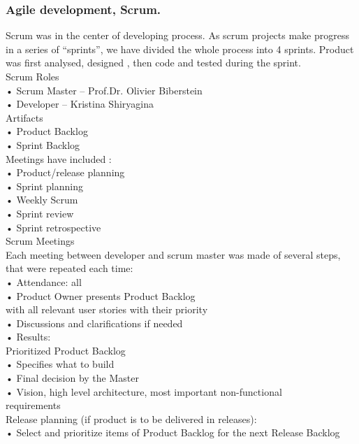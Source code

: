 \documentclass{scrartcl}
\begin{document}
\subsubsection{ Agile development, Scrum.} 
Scrum was in the center of developing process.
As scrum projects make progress in a series of “sprints”, we have divided the whole process into
4 sprints. Product was first analysed, designed , then code and tested during the sprint. \\
Scrum
Roles \\
	•	Scrum Master – Prof.Dr. Olivier Biberstein\\
	•	Developer – Kristina Shiryagina\\
 Artifacts \\
	•	Product Backlog\\
	•	Sprint Backlog\\
 Meetings have included :\\
	•	Product/release planning\\
	•	Sprint planning\\
	•	Weekly Scrum\\
	•	Sprint review\\
	•	Sprint retrospective\\
Scrum Meetings \\
Each meeting between developer and scrum master was made of several steps, that were repeated each time:\\
	•	Attendance: all\\
	•	Product Owner presents Product Backlog\\
with all relevant user stories with their priority\\
	•	Discussions and clarifications if needed\\
	•	Results:\\
Prioritized Product Backlog\\
	•	Specifies what to build\\
	•	Final decision by the Master\\
	•	Vision, high level architecture, most important non-functional\\
requirements\\
Release planning (if product is to be delivered in releases):\\
	•	Select and prioritize items of Product Backlog for the next Release Backlog\\
	
	
\end{document}

